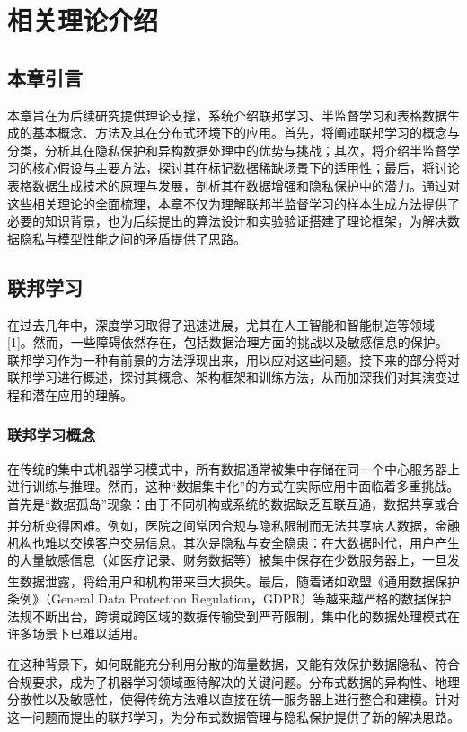 \chapter{相关理论介绍}
\thispagestyle{others}
\pagestyle{others}
\xiaosi

\section{本章引言}
本章旨在为后续研究提供理论支撑，系统介绍联邦学习、半监督学习和表格数据生成的基本概念、方法及其在分布式环境下的应用。首先，将阐述联邦学习的概念与分类，分析其在隐私保护和异构数据处理中的优势与挑战；其次，将介绍半监督学习的核心假设与主要方法，探讨其在标记数据稀缺场景下的适用性；最后，将讨论表格数据生成技术的原理与发展，剖析其在数据增强和隐私保护中的潜力。通过对这些相关理论的全面梳理，本章不仅为理解联邦半监督学习的样本生成方法提供了必要的知识背景，也为后续提出的算法设计和实验验证搭建了理论框架，为解决数据隐私与模型性能之间的矛盾提供了思路。

\section{联邦学习}
在过去几年中，深度学习取得了迅速进展，尤其在人工智能和智能制造等领域[1]。然而，一些障碍依然存在，包括数据治理方面的挑战以及敏感信息的保护。联邦学习作为一种有前景的方法浮现出来，用以应对这些问题。接下来的部分将对联邦学习进行概述，探讨其概念、架构框架和训练方法，从而加深我们对其演变过程和潜在应用的理解。
\subsection{联邦学习概念}
在传统的集中式机器学习模式中，所有数据通常被集中存储在同一个中心服务器上进行训练与推理。然而，这种“数据集中化”的方式在实际应用中面临着多重挑战。首先是“数据孤岛”现象：由于不同机构或系统的数据缺乏互联互通，数据共享或合并分析变得困难\textsuperscript{\cite{yang2019federated}}。例如，医院之间常因合规与隐私限制而无法共享病人数据，金融机构也难以交换客户交易信息。其次是隐私与安全隐患：在大数据时代，用户产生的大量敏感信息（如医疗记录、财务数据等）被集中保存在少数服务器上，一旦发生数据泄露，将给用户和机构带来巨大损失\textsuperscript{\cite{mcmahan2017communication}}。最后，随着诸如欧盟《通用数据保护条例》（General Data Protection Regulation，GDPR）等越来越严格的数据保护法规不断出台，跨境或跨区域的数据传输受到严苛限制，集中化的数据处理模式在许多场景下已难以适用。

在这种背景下，如何既能充分利用分散的海量数据，又能有效保护数据隐私、符合合规要求，成为了机器学习领域亟待解决的关键问题。分布式数据的异构性、地理分散性以及敏感性，使得传统方法难以直接在统一服务器上进行整合和建模。针对这一问题而提出的联邦学习，为分布式数据管理与隐私保护提供了新的解决思路。

